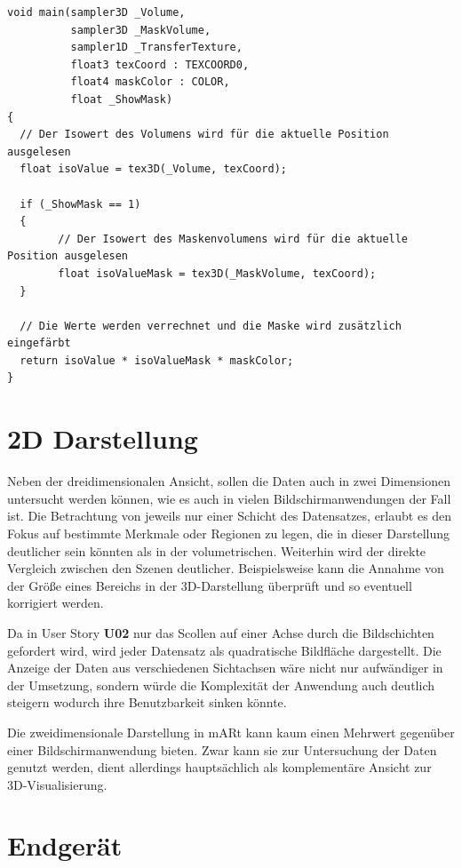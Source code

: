 \begin{verbatim}
void main(sampler3D _Volume,
		  sampler3D _MaskVolume,
          sampler1D _TransferTexture,
          float3 texCoord : TEXCOORD0,
          float4 maskColor : COLOR,
          float _ShowMask)
{
  // Der Isowert des Volumens wird für die aktuelle Position ausgelesen
  float isoValue = tex3D(_Volume, texCoord);
  
  if (_ShowMask == 1)
  {
		// Der Isowert des Maskenvolumens wird für die aktuelle Position ausgelesen
		float isoValueMask = tex3D(_MaskVolume, texCoord);
  }
	
  // Die Werte werden verrechnet und die Maske wird zusätzlich eingefärbt
  return isoValue * isoValueMask * maskColor;
}
\end{verbatim}

\section{2D Darstellung}

Neben der dreidimensionalen Ansicht, sollen die Daten auch in zwei Dimensionen untersucht werden können, wie es auch in vielen Bildschirmanwendungen der Fall ist.
Die Betrachtung von jeweils nur einer Schicht des Datensatzes, erlaubt es den Fokus auf bestimmte Merkmale oder Regionen zu legen, die in dieser Darstellung deutlicher sein könnten als in der volumetrischen. Weiterhin wird der direkte Vergleich zwischen den Szenen deutlicher. Beispielsweise kann die Annahme von der Größe eines Bereichs in der 3D-Darstellung überprüft und so eventuell korrigiert werden.

Da in User Story \textbf{U02} nur das Scollen auf einer Achse durch die Bildschichten gefordert wird, wird jeder Datensatz als quadratische Bildfläche dargestellt.
Die Anzeige der Daten aus verschiedenen Sichtachsen wäre nicht nur aufwändiger in der Umsetzung, sondern würde die Komplexität der Anwendung auch deutlich steigern wodurch ihre Benutzbarkeit sinken könnte. 

Die zweidimensionale Darstellung in mARt kann kaum einen Mehrwert gegenüber einer Bildschirmanwendung  bieten. Zwar kann sie zur Untersuchung der Daten genutzt werden, dient allerdings hauptsächlich als komplementäre Ansicht zur 3D-Visualisierung.

\section{Endgerät}
\label{device}

